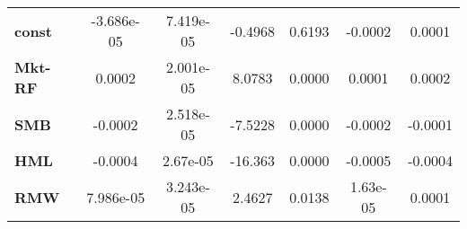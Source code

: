 \begin{center}
\begin{tabular}{lcccccc}
\midrule
\textbf{const}  &     -3.686e-05     &     7.419e-05      &     -0.4968     &      0.6193      &      -0.0002      &       0.0001       \\
\textbf{Mkt-RF} &       0.0002       &     2.001e-05      &      8.0783     &      0.0000      &       0.0001      &       0.0002       \\
\textbf{SMB}    &      -0.0002       &     2.518e-05      &     -7.5228     &      0.0000      &      -0.0002      &      -0.0001       \\
\textbf{HML}    &      -0.0004       &      2.67e-05      &     -16.363     &      0.0000      &      -0.0005      &      -0.0004       \\
\textbf{RMW}    &     7.986e-05      &     3.243e-05      &      2.4627     &      0.0138      &      1.63e-05     &       0.0001       \\
\bottomrule
\end{tabular}
\end{center}

